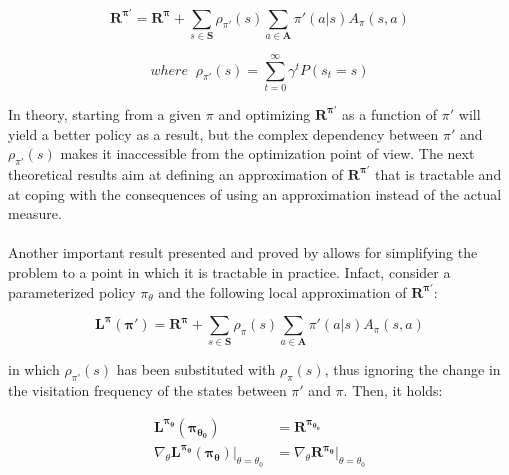                 \[ \mathbf{R^{\pi'}} = \mathbf{R^{\pi}} + \sum_{s \in \mathbf{S}} \rho_{\pi'}(s) \sum_{a \in \mathbf{A}} \pi'(a|s) A_{\pi}(s,a) \]
            
                \[ where \; \;\rho_{\pi'}(s) = \sum_{t=0}^{\infty} \gamma^t P(s_t = s)\]
                
                In theory, starting from a given $\pi$ and optimizing $\mathbf{R^{\pi'}}$ as a function of $\pi'$ will yield a better policy as a result, but the complex dependency between $\pi'$ and $\rho_{\pi'}(s)$ makes it inaccessible from the optimization point of view. The next theoretical results aim at defining an approximation of $\mathbf{R^{\pi'}}$ that is tractable and at coping with the consequences of using an approximation instead of the actual measure.
                \\\\
                Another important result presented and proved by  allows for simplifying the problem to a point in which it is tractable in practice. Infact, consider a parameterized policy $\pi_\theta$ and the following local approximation of $\mathbf{R^{\pi'}}$:
                
                \begin{definition}
                    \label{def:r_approximated}
                    \[ \mathbf{L^{\pi}(\pi')} = \mathbf{R^{\pi}} + \sum_{s \in \mathbf{S}} \rho_{\pi}(s) \sum_{a \in \mathbf{A}} \pi'(a|s) A_{\pi}(s,a) \]
                \end{definition}
                
                in which $\rho_{\pi'}(s)$ has been substituted with $\rho_{\pi}(s)$, thus ignoring the change in the visitation frequency of the states between $\pi'$ and $\pi$. Then, it holds:
                
                \begin{align}
                    \mathbf{L^{\pi_\theta}(\pi_{\theta_0})} &= \mathbf{R^{\pi_{\theta_0}}}\\
                    \nabla_\theta \mathbf{L^{\pi_\theta}(\pi_\theta)} \biggr\rvert_{\theta = \theta_0} &= \nabla_\theta \mathbf{R^{\pi_\theta}} \biggr\rvert_{\theta = \theta_0}\nonumber
                \end{align}
                
